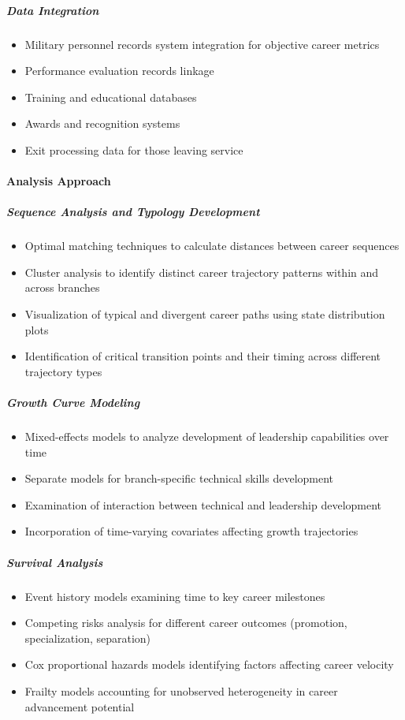 \documentclass[../main.tex]{subfiles}
\begin{document}
\subparagraph{Data Integration}
\begin{itemize}
\item Military personnel records system integration for objective career metrics
\item Performance evaluation records linkage
\item Training and educational databases
\item Awards and recognition systems
\item Exit processing data for those leaving service
\end{itemize}

\paragraph{Analysis Approach}

\subparagraph{Sequence Analysis and Typology Development}
\begin{itemize}
\item Optimal matching techniques to calculate distances between career sequences \citep{joseph2012career}
\item Cluster analysis to identify distinct career trajectory patterns within and across branches
\item Visualization of typical and divergent career paths using state distribution plots
\item Identification of critical transition points and their timing across different trajectory types
\end{itemize}

\subparagraph{Growth Curve Modeling}
\begin{itemize}
\item Mixed-effects models to analyze development of leadership capabilities over time \citep{lme4slides2011}
\item Separate models for branch-specific technical skills development
\item Examination of interaction between technical and leadership development
\item Incorporation of time-varying covariates affecting growth trajectories
\end{itemize}

\subparagraph{Survival Analysis}
\begin{itemize}
\item Event history models examining time to key career milestones
\item Competing risks analysis for different career outcomes (promotion, specialization, separation)
\item Cox proportional hazards models identifying factors affecting career velocity
\item Frailty models accounting for unobserved heterogeneity in career advancement potential
\end{itemize}
\end{document}
